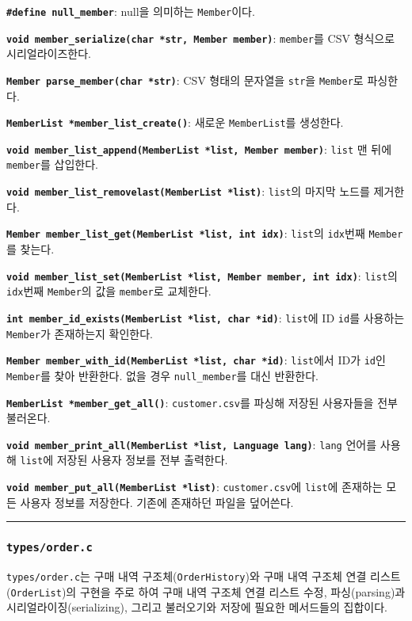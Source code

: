 \documentclass[runningheads]{llncs}
\begin{document}
\textbf{\texttt{\#define null_member}}: null을 의미하는 \texttt{Member}이다.

\textbf{\texttt{void member_serialize(char *str, Member member)}}: \texttt{member}를 CSV 형식으로 시리얼라이즈한다.

\textbf{\texttt{Member parse_member(char *str)}}: CSV 형태의 문자열을 \texttt{str}을 \texttt{Member}로 파싱한다.

\textbf{\texttt{MemberList *member_list_create()}}: 새로운 \texttt{MemberList}를 생성한다.

\textbf{\texttt{void member_list_append(MemberList *list, Member member)}}: \texttt{list} 맨 뒤에 \texttt{member}를 삽입한다.

\textbf{\texttt{void member_list_removelast(MemberList *list)}}: \texttt{list}의 마지막 노드를 제거한다.

\textbf{\texttt{Member member_list_get(MemberList *list, int idx)}}: \texttt{list}의 \texttt{idx}번째 \texttt{Member}를 찾는다.

\textbf{\texttt{void member_list_set(MemberList *list, Member member, int idx)}}: \texttt{list}의 \texttt{idx}번째 \texttt{Member}의 값을 \texttt{member}로 교체한다.

\textbf{\texttt{int member_id_exists(MemberList *list, char *id)}}: \texttt{list}에 ID \texttt{id}를 사용하는 \texttt{Member}가 존재하는지 확인한다.

\textbf{\texttt{Member member_with_id(MemberList *list, char *id)}}: \texttt{list}에서 ID가 \texttt{id}인 \texttt{Member}를 찾아 반환한다. 없을 경우 \texttt{null_member}를 대신 반환한다.

\textbf{\texttt{MemberList *member_get_all()}}: \texttt{customer.csv}를 파싱해 저장된 사용자들을 전부 불러온다.

\textbf{\texttt{void member_print_all(MemberList *list, Language lang)}}: \texttt{lang} 언어를 사용해 \texttt{list}에 저장된 사용자 정보를 전부 출력한다.

\textbf{\texttt{void member_put_all(MemberList *list)}}: \texttt{customer.csv}에 \texttt{list}에 존재하는 모든 사용자 정보를 저장한다. 기존에 존재하던 파일을 덮어쓴다.

\noindent\rule{2cm}{0.4pt}

\subsubsection{\texttt{types/order.c}}
\texttt{types/order.c}는 구매 내역 구조체(\texttt{OrderHistory})와 구매 내역 구조체 연결 리스트(\texttt{OrderList})의 구현을 주로 하여 구매 내역 구조체 연결 리스트 수정, 파싱(parsing)과 시리얼라이징(serializing), 그리고 불러오기와 저장에 필요한 메서드들의 집합이다.
\end{document}
